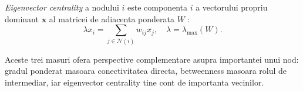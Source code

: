 \begin{definition}
\textit{Eigenvector centrality} a nodului $i$ este componenta $i$ a
vectorului propriu dominant $\mathbf{x}$ al matricei de adiacenta ponderata $W$
\citep{bonacich1987}:
\[
    \lambda x_i = \sum_{j \in \mathcal{N}(i)} w_{ij} x_j, \quad \lambda = \lambda_{\max}(W).
\]
\end{definition}

Aceste trei masuri ofera perspective complementare asupra importantei unui nod:
gradul ponderat masoara conectivitatea directa, betweenness masoara rolul de
intermediar, iar eigenvector centrality tine cont de importanta vecinilor.